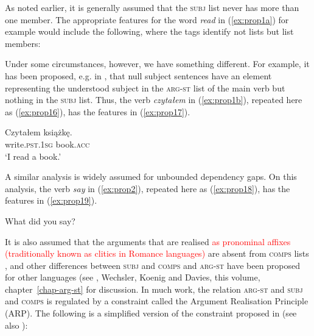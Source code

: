 \documentclass[output=paper
	        ,collection
	        ,collectionchapter
 	        ,biblatex
                ,babelshorthands
                ,newtxmath
                ,draftmode
                ,colorlinks, citecolor=brown
]{langscibook}
\begin{document}
\ea\label{ex:prop14}
\z

As noted earlier, it is generally assumed that the \textsc{subj} list never has more than one member. The appropriate features for the word \emph{read} in (\ref{ex:prop1a}) for example would include the following, where the tags identify not lists but list members:

\ea\label{ex:prop15}
\z

Under some circumstances, however, we have something different. For example, it has been proposed, e.g. in \citet[65]{ManningandSag1998}, that null subject sentences have an element representing the understood subject in the \textsc{arg-st} list of the main verb but nothing in the \textsc{subj} list. Thus, the verb \emph{czytałem} in (\ref{ex:prop1b}), repeated here as (\ref{ex:prop16}), has the features in (\ref{ex:prop17}).

\ea\label{ex:prop16}
\gll Czytałem książkę.\\
write.\textsc{pst.1sg} book.\textsc{acc}\\
\glt ‘I read a book.’

\ex\label{ex:prop17}
\z

A similar analysis is widely assumed for unbounded dependency gaps. On this analysis, the verb \emph{say} in (\ref{ex:prop2}), repeated here as (\ref{ex:prop18}), has the features in (\ref{ex:prop19}).

\ea\label{ex:prop18}
What did you say?

\ex\label{ex:prop19}
\z

It is also assumed that the arguments that are realised \textcolor{red}{as pronominal affixes (traditionally known as clitics in Romance languages)} are absent from \textsc{comps} lists \citep{MS97a-u,monachesi05}, and other differences between \textsc{subj} and \textsc{comps} and \textsc{arg-st} have been proposed for other languages (see \citealt{ManningandSag1998}, Wechsler, Koenig and Davies, this volume, chapter~\ref{chap-arg-st} for discussion. In much work, the relation \textsc{arg-st} and \textsc{subj} and \textsc{comps} is regulated by a constraint called the Argument Realisation Principle (ARP). The following is a simplified version of the constraint proposed in \citet[171]{GSag2000a-u} (see also \citealt[12]{BMS2001a}):
\end{document}
